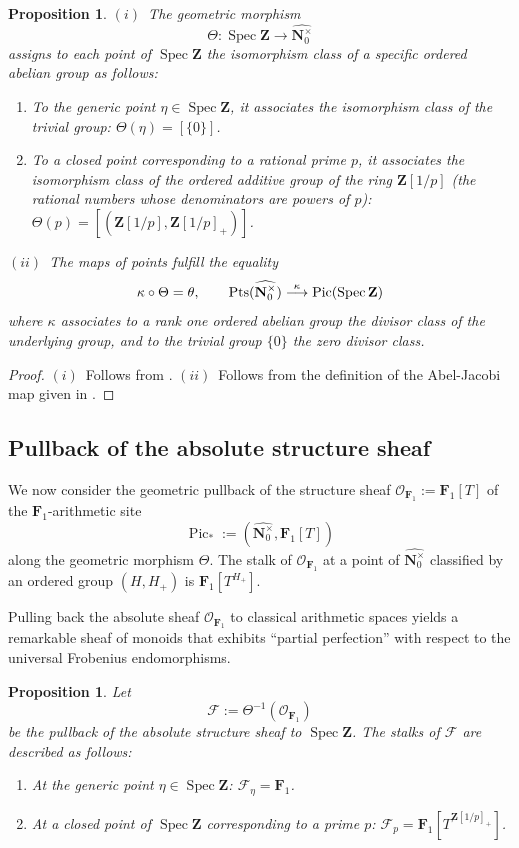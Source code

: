 \documentclass[11pt,a4paper]{article}
\newtheorem{proposition}[theorem]{Proposition}
\newcommand{\N}{\mathbf{N}}
\newcommand{\Z}{\mathbf{Z}}
\newcommand{\Fone}{\mathbf{F}_{1}}
\def\spz{\Spec \Z}
\newcommand{\nato}{\widehat{\N^\times_0}}
\newcommand{\Pt}{{\rm Pts}}
\newcommand{\Spec}{\operatorname{Spec}}
\newcommand{\Pic}{\operatorname{Pic}} \newcommand{\Jac}{\operatorname{Jac}}
\newcommand{\picone}{{\Pic}_{*}}
\begin{document}
\begin{proposition}
$(i)$~The geometric morphism  
\[
\Theta: \Spec \Z \longrightarrow \nato
\]
assigns to each  point of $\Spec \Z$ the  isomorphism class of a specific ordered abelian group as follows:
\begin{enumerate}
    \item To the generic point $\eta\in \Spec \Z$, it associates the isomorphism class of the trivial group: $\Theta(\eta) = [\{0\}]$.
    \item To a closed point corresponding to a rational prime $p$, it associates the isomorphism class of the ordered additive group of the ring $\Z[1/p]$ (the rational numbers whose denominators are powers of $p$): $\Theta(p) = [(\Z[1/p], \Z[1/p]_+)]$.
\end{enumerate}
$(ii)$~The maps of points fulfill the equality 
\[
\kappa\circ\Theta=\theta, \qquad   \Pt(\nato)\stackrel{\kappa}{\longrightarrow} \Pic(\spz)
\]
where $\kappa$ associates to a rank one ordered abelian group the divisor class of the underlying group, and to the trivial group $\{0\}$ the zero divisor class.
\end{proposition}
\begin{proof} $(i)$~Follows from \cite[Theorem 5.3]{CC1}.\newline
$(ii)$~Follows from the definition of the Abel-Jacobi map given in \cite{CC6}. \end{proof}



\subsection{Pullback of the absolute structure sheaf}

We now consider the geometric pullback of the structure sheaf $\mathcal{O}_{\Fone}:=\Fone[T]$ of the $\Fone$-arithmetic site 
\[
\picone := (\nato, \Fone[T])
\]
along the geometric morphism $\Theta$. 
The stalk of $\mathcal{O}_{\Fone}$ at a point of  $\nato$ classified by an ordered group $(H, H_+)$ is $\Fone[T^{H_+}]$. \vspace{.03in}



Pulling back the absolute sheaf $\mathcal{O}_{\Fone}$ to classical arithmetic spaces yields a remarkable sheaf of monoids that exhibits ``partial perfection'' with respect to the universal Frobenius endomorphisms.

\begin{proposition}\label{prop12}
Let \[
\mathcal{F} := \Theta^{-1}(\mathcal{O}_{\Fone})
\]
be the pullback of the absolute structure sheaf to $\Spec \Z$. The stalks of $\mathcal{F}$ are described as follows:
\begin{enumerate}
    \item At the generic point $\eta\in \spz$: $\mathcal{F}_\eta = \Fone$.
    \item At a closed point of $\spz$ corresponding to a  prime $p$: $\mathcal{F}_p = \Fone[T^{\Z[1/p]_+}]$.
\end{enumerate}
\end{proposition}
\end{document}
